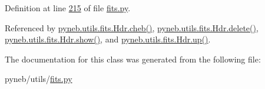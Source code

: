 Definition at line \hyperlink{fits_8py_source_l00215}{215} of file \hyperlink{fits_8py_source}{fits.\-py}.



Referenced by \hyperlink{fits_8py_source_l00232}{pyneb.\-utils.\-fits.\-Hdr.\-cheb()}, \hyperlink{fits_8py_source_l00228}{pyneb.\-utils.\-fits.\-Hdr.\-delete()}, \hyperlink{fits_8py_source_l00219}{pyneb.\-utils.\-fits.\-Hdr.\-show()}, and \hyperlink{fits_8py_source_l00223}{pyneb.\-utils.\-fits.\-Hdr.\-up()}.



The documentation for this class was generated from the following file\-:\begin{DoxyCompactItemize}
\item 
pyneb/utils/\hyperlink{fits_8py}{fits.\-py}\end{DoxyCompactItemize}
